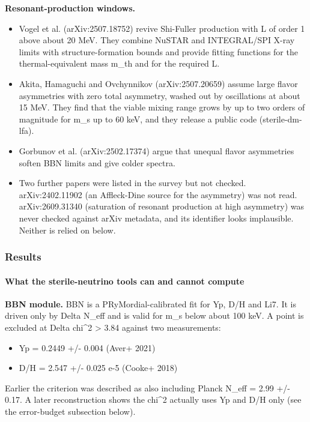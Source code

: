 \documentclass[11pt,a4paper]{article}
\begin{document}
\textbf{Resonant-production windows.}

\begin{itemize}
  \item Vogel et al. (arXiv:2507.18752) revive Shi-Fuller production with L of order 1 above about 20 MeV. They combine NuSTAR and INTEGRAL/SPI X-ray limits with structure-formation bounds and provide fitting functions for the thermal-equivalent mass m\_th and for the required L.
  \item Akita, Hamaguchi and Ovchynnikov (arXiv:2507.20659) assume large flavor asymmetries with zero total asymmetry, washed out by oscillations at about 15 MeV. They find that the viable mixing range grows by up to two orders of magnitude for m\_s up to 60 keV, and they release a public code (sterile-dm-lfa).
  \item Gorbunov et al. (arXiv:2502.17374) argue that unequal flavor asymmetries soften BBN limits and give colder spectra.
  \item Two further papers were listed in the survey but not checked. arXiv:2402.11902 (an Affleck-Dine source for the asymmetry) was not read. arXiv:2609.31340 (saturation of resonant production at high asymmetry) was never checked against arXiv metadata, and its identifier looks implausible. Neither is relied on below.
\end{itemize}
\subsubsection*{Results}
\paragraph{What the sterile-neutrino tools can and cannot compute}
\textbf{BBN module.} BBN is a PRyMordial-calibrated fit for Yp, D/H and Li7. It is driven only by Delta N\_eff and is valid for m\_s below about 100 keV. A point is excluded at Delta chi\textasciicircum{}2 \textgreater{} 3.84 against two measurements:

\begin{itemize}
  \item Yp = 0.2449 +/- 0.004 (Aver+ 2021)
  \item D/H = 2.547 +/- 0.025 e-5 (Cooke+ 2018)
\end{itemize}
Earlier the criterion was described as also including Planck N\_eff = 2.99 +/- 0.17. A later reconstruction shows the chi\textasciicircum{}2 actually uses Yp and D/H only (see the error-budget subsection below).
\end{document}
